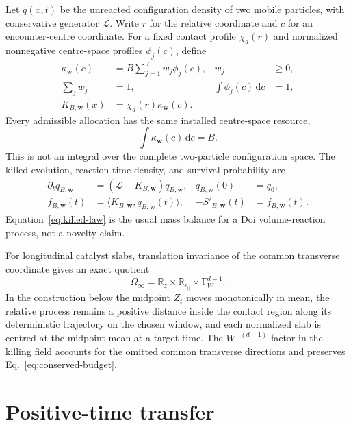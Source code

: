 \documentclass[aps,physrev,reprint,amsmath,amssymb,longbibliography,floatfix]{revtex4-2}
\newcommand{\dd}{\mathrm d}
\begin{document}
Let \(q(x,t)\) be the unreacted configuration density of two mobile
particles, with conservative generator \(\mathcal L\).  Write \(r\) for the
relative coordinate and \(c\) for an encounter-centre coordinate.  For a
fixed contact profile \(\chi_a(r)\) and normalized nonnegative centre-space
profiles \(\phi_j(c)\), define
\begin{align}
 \kappa_{\bm w}(c)&=B\sum_{j=1}^{J}w_j\phi_j(c),
 &w_j&\ge0,\nonumber\\
 \sum_jw_j&=1,
 &\int\phi_j(c)\,\dd c&=1,\nonumber\\
 K_{B,\bm w}(x)&=\chi_a(r)\kappa_{\bm w}(c).
 \label{eq:budget-field}
\end{align}
Every admissible allocation has the same installed centre-space resource,
\begin{equation}
 \int\kappa_{\bm w}(c)\,\dd c=B.
 \label{eq:conserved-budget}
\end{equation}
This is not an integral over the complete two-particle configuration space.
The killed evolution, reaction-time density, and survival probability are
\begin{align}
 \partial_tq_{B,\bm w}&=(\mathcal L-K_{B,\bm w})q_{B,\bm w},
 &q_{B,\bm w}(0)&=q_0,\nonumber\\
 f_{B,\bm w}(t)&=\langle K_{B,\bm w},q_{B,\bm w}(t)\rangle,
 &-S'_{B,\bm w}(t)&=f_{B,\bm w}(t).
 \label{eq:killed-law}
\end{align}
Equation~\eqref{eq:killed-law} is the usual mass balance for a Doi
volume-reaction process, not a novelty claim.

For longitudinal catalyst slabs, translation invariance of the common
transverse coordinate gives an exact quotient
\begin{equation}
 \Omega_\infty
 =\mathbb R_z\times\mathbb R_{r_\parallel}\times
   \mathbb T_W^{d-1}.
 \label{eq:quotient}
\end{equation}
In the construction below the midpoint \(Z_t\) moves monotonically in mean,
the relative process remains a positive distance inside the contact region
along its deterministic trajectory on the chosen window, and each normalized
slab is centred at the midpoint mean at a target time.  The
\(W^{-(d-1)}\) factor in the killing field accounts for the omitted common
transverse directions and preserves Eq.~\eqref{eq:conserved-budget}.

\section{Positive-time transfer}
\label{sec:transfer}
\end{document}

